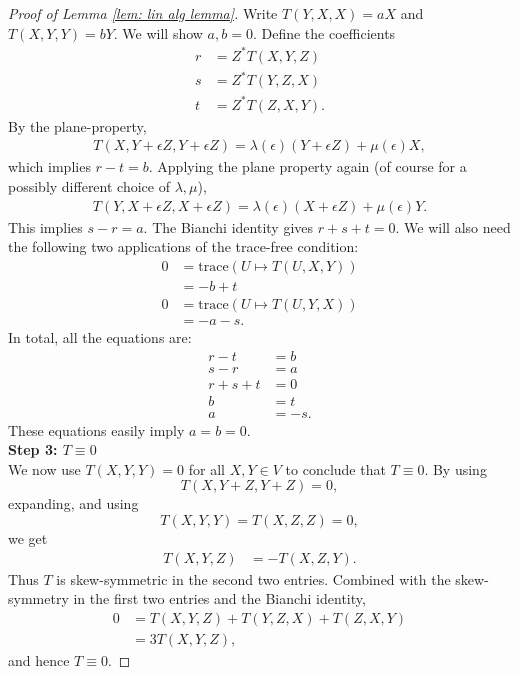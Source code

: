 \documentclass[10pt,a4paper]{amsart}
\begin{document}
\begin{proof}[Proof of Lemma \ref{lem: lin alg lemma}]
Write $T(Y,X,X) = aX$ and $T(X,Y,Y) = bY$. We will show $a,b=0$. Define the coefficients 
\begin{align}
    r &= Z^* T(X,Y,Z) \\
    s &= Z^*T(Y,Z,X) \\
    t &= Z^*T(Z,X,Y).
\end{align}
By the plane-property, 
\begin{align}\label{eq: 3 alg lemma}
    T(X, Y+\epsilon Z, Y +\epsilon Z) = \lambda(\epsilon) (Y + \epsilon Z) + \mu(\epsilon) X,
    \end{align}
    which implies $r-t=b$. 
    Applying the plane property again (of course for a possibly different choice of $\lambda, \mu$), 
    \begin{align}
        T(Y, X + \epsilon Z, X + \epsilon Z) = \lambda(\epsilon) (X+ \epsilon Z) + \mu(\epsilon)Y.
    \end{align}
    This implies $s-r = a$. The Bianchi identity gives $r + s + t =0$. We will also need the following two applications of the trace-free condition: 
    \begin{align}
        0 &= \mathrm{trace}(U \mapsto T(U,X,Y)) \\
        &= -b + t \\
        0 &= \mathrm{trace}(U \mapsto T(U,Y,X)) \\
        &= -a - s.
    \end{align}
    In total, all the equations are: 
    \begin{align}
        r - t &= b \\
        s-r &= a \\
        r + s + t &= 0 \\
        b &= t \\
        a &= -s.
    \end{align}
    These equations easily imply $a = b = 0$. \\

    \noindent \textbf{Step 3: $T \equiv 0$}\\

    We now use $T(X,Y,Y) = 0$ for all $X,Y \in V$ to conclude that $T \equiv 0$. By using
    \begin{equation}
    T(X, Y+ Z, Y+Z) =0,
    \end{equation}
     expanding, and using 
     \begin{equation}
     T(X,Y,Y) = T(X,Z,Z) = 0,
     \end{equation}
      we get  
    \begin{align}
        T(X,Y,Z) &= - T(X,Z,Y). 
    \end{align}
    Thus $T$ is skew-symmetric in the second two entries. Combined with the skew-symmetry in the first two entries and the Bianchi identity,
    \begin{align}
        0 &= T(X,Y,Z) + T(Y,Z,X) + T(Z,X,Y) \\
        &= 3T(X,Y,Z),
    \end{align}
    and hence $T \equiv 0$. 
\end{proof}
\end{document}
